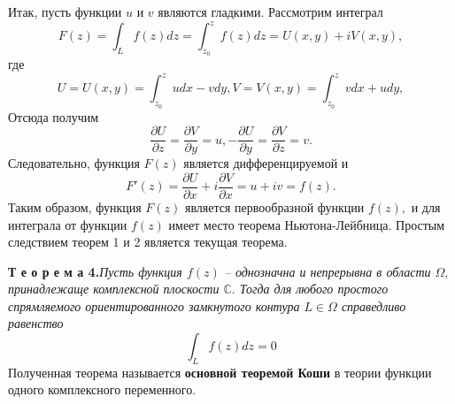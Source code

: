 \documentclass[12pt,titlepage]{report}
\begin{document}
Итак, пусть функции $u$ и $v$ являются гладкими. Рассмотрим интеграл
\vskip 3mm
$$F(z)=\int_L f(z)dz=\int_{z_{0}}^z f(z)dz=U(x,y)+iV(x,y),$$
\vskip 3mm
где
\vskip 3mm
$$U=U(x,y)=\int_{z_{0}}^z {udx-vdy}, V=V(x,y)=\int_{z_{0}}^z{vdx+udy},$$
\vskip 3mm
Отсюда получим
\vskip 3mm
$$\frac{\partial U}{\partial z}=\frac{\partial V}{\partial y} = u, -\frac{\partial U}{\partial y}=\frac{\partial V}{\partial z}=v.$$
\vskip 3mm
Следовательно, функция $F(z)$ является дифференцируемой и
\vskip 3mm
$$F'(z)=\frac{\partial U}{\partial x}+i\frac{\partial V}{\partial x}=u+iv=f(z).$$
\vskip 3mm
Таким образом, функция $F(z)$ является первообразной функции $f(z),$ и для интеграла от функции $f(z)$ имеет место теорема Ньютона-Лейбница.
Простым следствием теорем 1 и 2 является текущая теорема.
\par\textbf{Т е о р е м а 4.}\textit{Пусть функция $f(z)$ -- однозначна и непрерывна в области $\Omega,$ принадлежаще комплексной плоскости $\mathbb{C}.$ Тогда для любого простого спрямляемого ориентированного замкнутого контура $L\in\Omega$ справедливо равенство}
\vskip 5mm
$$\int_L f(z)dz=0$$
\vskip 5mm
Полученная теорема называется \textbf{ основной теоремой Коши} в теории функции одного комплексного переменного.
\end{document}
